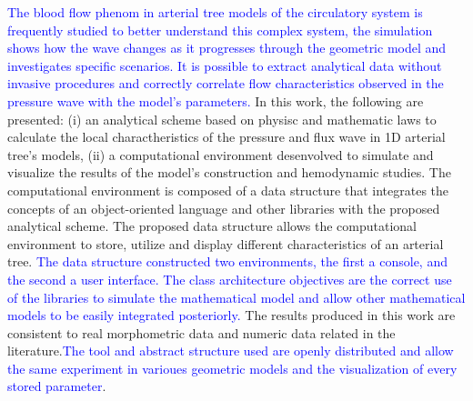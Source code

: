 \documentclass[dsc,divps,pdftex]{mmc}
\newcommand{\igunew}[1]{\textcolor{blue}{#1}}
\begin{document}
\begin{foreignabstract}
	\igunew{The blood flow phenom in arterial tree models of the circulatory system is frequently studied to better understand this complex system, the simulation shows how the wave changes  as it progresses through the geometric model and investigates specific scenarios. It is possible to extract analytical data without invasive procedures and correctly correlate flow characteristics observed in the pressure wave with the model's parameters.}
	In this work, the following are presented: (i) an analytical scheme based on physisc and mathematic laws to calculate the local charactheristics of the pressure and flux wave in 1D arterial tree's models, (ii) a computational environment desenvolved to simulate and visualize the results of the model's construction and hemodynamic studies. 
	The computational environment is composed of a data structure that integrates the concepts of an object-oriented language and other libraries with the proposed analytical scheme.
	The proposed data structure allows the computational environment to store, utilize and display different characteristics of an arterial tree. \igunew{The data structure constructed two environments, the first a console, and the second a user interface. The class architecture objectives are the correct use of the libraries to simulate the mathematical model and allow other mathematical models to be easily integrated posteriorly.}
	The results produced in this work are consistent to real morphometric data and numeric data related in the literature.\igunew{The tool and abstract structure used are openly distributed and allow the same experiment in varioues geometric models and the visualization of every stored parameter}.
\end{foreignabstract}





\listoffigures  %
\listoftables


\tableofcontents




\mainmatter


%
%
%
 
\end{document}

